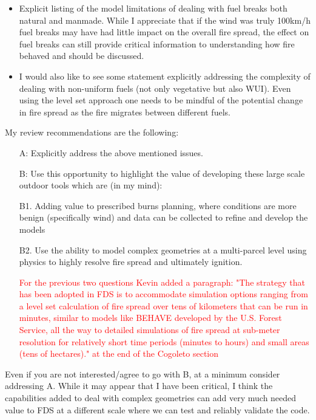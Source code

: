 \documentclass[12pt]{article}
\newcommand\hl[1]{\textcolor{red}{#1}}
\begin{document}
\begin{itemize}
   \item Explicit listing of the model limitations of dealing with fuel breaks both natural and manmade. While I appreciate that if the wind was truly 100km/h fuel breaks may have had little impact on the overall fire spread, the effect on fuel breaks can still provide critical information to understanding how fire behaved and should be discussed. 

   \item I would also like to see some statement explicitly addressing the complexity of dealing with non-uniform fuels (not only vegetative but also WUI). Even using the level set approach one needs to be mindful of the potential change in fire spread as the fire migrates between different fuels.

\end{itemize}


My review recommendations are the following:

\begin{enumerate}
    \item[A:] Explicitly address the above mentioned issues.

    \item[B:] Use this opportunity to highlight the value of developing these large scale outdoor tools which are (in my mind):
    \item[B1.] Adding value to prescribed burns planning, where conditions are more benign (specifically wind) and data can be collected to refine and develop the models
    \item[B2.] Use the ability to model complex geometries at a multi-parcel level using physics to highly resolve fire spread and ultimately ignition.

\hl{For the previous two questions Kevin added a paragraph: "The strategy that has been adopted in FDS is to accommodate simulation options ranging from a level set calculation of fire spread over tens of kilometers that can be run in minutes, similar to models like BEHAVE developed by the U.S. Forest Service, all the way to detailed simulations of fire spread at sub-meter resolution for relatively short time periods (minutes to hours) and small areas (tens of hectares)." at the end of the Cogoleto section}

\end{enumerate}

Even if you are not interested/agree to go with B, at a minimum consider addressing A. While it may appear that I have been critical, I think the capabilities added to deal with complex geometries can add very much needed value to FDS at a different scale where we can test and reliably validate the code. 
\end{document}
